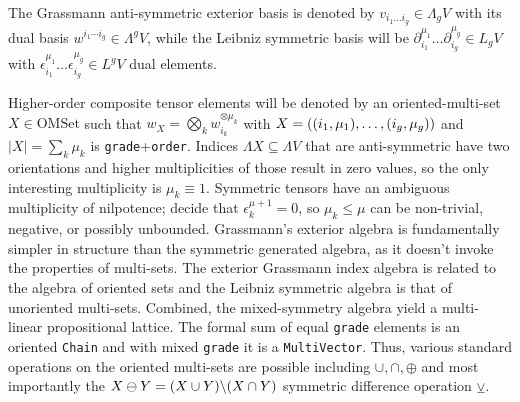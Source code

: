 \documentclass{juliacon}
\begin{document}
\begin{definition}
	The Grassmann anti-symmetric exterior basis is denoted by $v_{i_1\dots i_g}\in\Lambda_gV$ with its dual basis $w^{i_1\cdots i_g}\in\Lambda^gV$, while the Leibniz symmetric basis will be $\partial_{i_1}^{\mu_1}\dots\partial_{i_g}^{\mu_g}\in L_gV$ with $\epsilon_{i_1}^{\mu_1}\dots\epsilon_{i_g}^{\mu_g}\in L^gV$ dual elements.
\end{definition}
Higher-order composite tensor elements will be denoted by an oriented-multi-set $X\in\text{OMSet}$ such that $w_X = \bigotimes_k w_{i_k}^{\otimes\mu_k}$ with $X = \left((i_1,\mu_1),\dots,(i_g,\mu_g)\right)$ and $|X|=\sum_k\mu_k$ is \verb`grade`+\verb`order`.
Indices $\Lambda X\subseteq\Lambda V$ that are anti-symmetric have two orientations and higher multiplicities of those result in zero values, so the only interesting multiplicity is $\mu_k\equiv 1$.
Symmetric tensors have an ambiguous multiplicity of nilpotence; decide that $\epsilon_k^{\mu+1}=0$, so $\mu_k\leq\mu$ can be non-trivial, negative, or possibly unbounded.
Grassmann's exterior algebra is fundamentally simpler in structure than the symmetric generated algebra, as it doesn't invoke the properties of multi-sets.
The exterior Grassmann index algebra is related to the algebra of oriented sets and the Leibniz symmetric algebra is that of unoriented multi-sets. 
Combined, the mixed-symmetry algebra yield a multi-linear propositional lattice.
The formal sum of equal \verb`grade` elements is an oriented \verb`Chain` and with mixed \verb`grade` it is a \verb`MultiVector`.
Thus, various standard operations on the oriented multi-sets are possible including $\cup,\cap,\oplus$ and most importantly the $X\ominus Y=(X\cup Y)\backslash(X\cap Y)$ symmetric difference operation $\veebar$.
\end{document}
